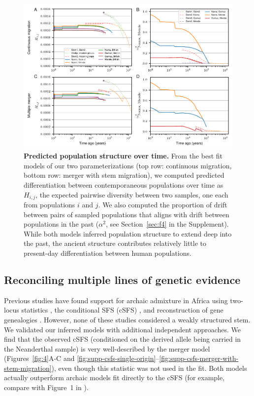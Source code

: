 \documentclass[]{article}
\begin{document}
\begin{figure}[t!]
    \centering
    \includegraphics{figures/fig3.pdf}
    \caption{
        \textbf{Predicted population structure over time.}
        From the best fit models of our two parameterizations (top row:
        continuous migration, bottom row: merger with stem migration), we computed
        predicted differentiation between contemporaneous populations over time
        as $H_{i,j}$, the expected pairwise diversity between two samples, one
        each from populations $i$ and $j$.
        We also computed the proportion of drift between pairs of sampled
        populations that aligns with drift between populations in the past
        ($\alpha^2$, see Section~\ref{sec:f4} in the Supplement).
        While both models inferred population structure to extend deep into the
        past, the ancient structure contributes relatively little to present-day
        differentiation between human populations.
    }
    \label{fig:3}
\end{figure}

\subsection*{Reconciling multiple lines of genetic evidence}

Previous studies have found support for archaic admixture in Africa using
two-locus statistics \citep{Hsieh2016-gk,Ragsdale2019-nt}, the conditional SFS
(cSFS) \citep{Durvasula2020-td}, and reconstruction of gene genealogies
\citep{Speidel2019-nj}. However, none of these studies considered a weakly
structured stem. We validated our inferred models with additional independent
approaches. We find that the observed cSFS (conditioned on the derived allele
being carried in the Neanderthal sample) is very well-described by the merger
model (Figures~\ref{fig:4}A-C and
\ref{fig:supp-csfs-single-origin}--\ref{fig:supp-csfs-merger-with-stem-migration}),
even though this statistic was not used in the fit. Both models actually outperform
archaic models fit directly to the cSFS (for example, compare with Figure~1 in
\citet{Durvasula2020-td}).
\end{document}
